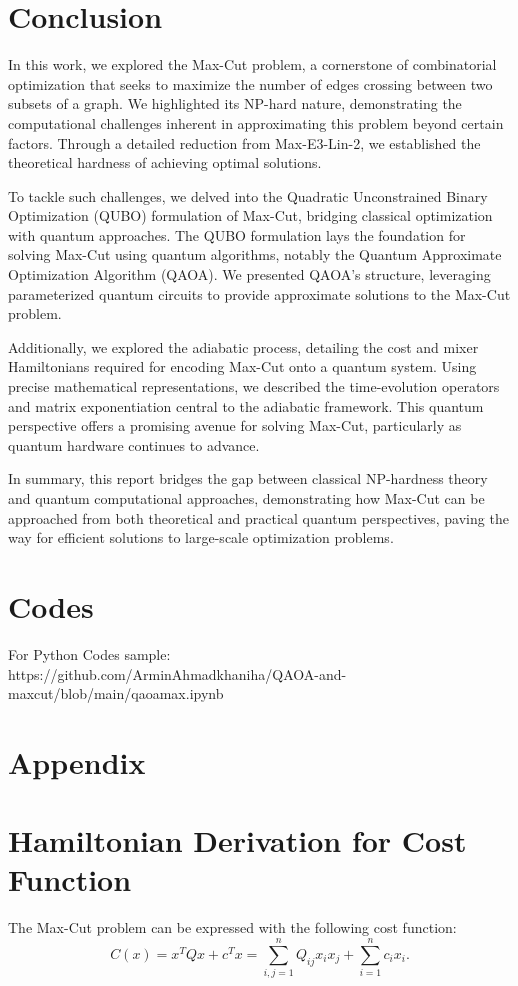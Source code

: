\documentclass[12pt]{article}
\begin{document}
\section{Conclusion}
In this work, we explored the Max-Cut problem, a cornerstone of combinatorial optimization that seeks to maximize the number of edges crossing between two subsets of a graph. We highlighted its NP-hard nature, demonstrating the computational challenges inherent in approximating this problem beyond certain factors. Through a detailed reduction from Max-E3-Lin-2, we established the theoretical hardness of achieving optimal solutions.  

To tackle such challenges, we delved into the Quadratic Unconstrained Binary Optimization (QUBO) formulation of Max-Cut, bridging classical optimization with quantum approaches. The QUBO formulation lays the foundation for solving Max-Cut using quantum algorithms, notably the Quantum Approximate Optimization Algorithm (QAOA). We presented QAOA's structure, leveraging parameterized quantum circuits to provide approximate solutions to the Max-Cut problem.  

Additionally, we explored the adiabatic process, detailing the cost and mixer Hamiltonians required for encoding Max-Cut onto a quantum system. Using precise mathematical representations, we described the time-evolution operators and matrix exponentiation central to the adiabatic framework. This quantum perspective offers a promising avenue for solving Max-Cut, particularly as quantum hardware continues to advance.  

In summary, this report bridges the gap between classical NP-hardness theory and quantum computational approaches, demonstrating how Max-Cut can be approached from both theoretical and practical quantum perspectives, paving the way for efficient solutions to large-scale optimization problems.

\section{Codes}
For Python Codes sample:\\https://github.com/ArminAhmadkhaniha/QAOA-and-maxcut/blob/main/qaoamax.ipynb

               
 
 
\section*{Appendix}
\appendix
\section{Hamiltonian Derivation for Cost Function}
\label{appendix:hamiltonian}
The Max-Cut problem can be expressed with the following cost function:
\[
C(x) = x^T Q x + c^T x = \sum_{i,j=1}^{n} Q_{ij} x_i x_j + \sum_{i=1}^{n} c_i x_i.
\]
\end{document}
